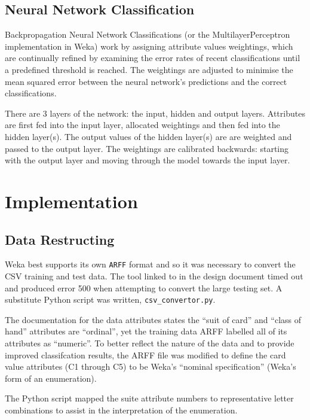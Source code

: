 \documentclass[11pt, a4paper]{article}
\begin{document}
\subsection*{Neural Network Classification}

Backpropagation Neural Network Classifications (or the MultilayerPerceptron implementation in Weka) work by assigning attribute values weightings, which are continually refined by examining the error rates of recent classifications until a predefined threshold is reached. The weightings are adjusted to minimise the mean squared error between the neural network's predictions and the correct classifications.

There are 3 layers of the network: the input, hidden and output layers. Attributes are first fed into the input layer, allocated weightings and then fed into the hidden layer(s). The output values of the hidden layer(s) are are weighted and passed to the output layer. The weightings are calibrated backwards: starting with the output layer and moving through the model towards the input layer.

\section*{Implementation}

\subsection*{Data Restructing}

Weka best supports its own \texttt{ARFF} format and so it was necessary to convert the CSV training \cite{trainingdata} and test \cite{testdata} data. The tool linked to in the design document \cite{arffconv} timed out and produced error 500 when attempting to convert the large testing set. A substitute Python script was written, \texttt{csv\_convertor.py}.

The documentation for the data attributes \cite{expattr} states the ``suit of card'' and ``class of hand'' attributes are ``ordinal'', yet the training data ARFF labelled all of its attributes as ``numeric''. To better reflect the nature of the data and to provide improved classifcation results, the ARFF file was modified to define the card value attributes (C1 through C5) to be Weka's ``nominal specification'' (Weka's form of an enumeration). 

The Python script mapped the suite attribute numbers to representative letter combinations to assist in the interpretation of the enumeration.
\end{document}
